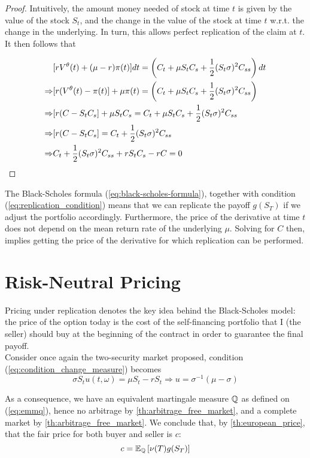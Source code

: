 \documentclass[../TGMAFFIRO.tex]{subfiles}
\begin{document}
\begin{proof}
	Intuitively, the amount money needed of stock at time $t$ is given by the value of the stock $S_t$, and the change in the value of the stock at time $t$ w.r.t. the change in the underlying. In turn, this allows perfect replication of the claim at $t$. It then follows that
	
	\begin{align}
		&[rV^\theta(t) + (\mu - r) \pi(t)] dt = \left(C_t + \mu S_t C_s + \frac{1}{2}(S_t\sigma)^2C_{ss} \right) dt\nonumber\\
		\Rightarrow & [r(V^\theta(t) - \pi(t)] + \mu\pi(t) = \left(C_t + \mu S_t C_s + \frac{1}{2}(S_t\sigma)^2C_{ss} \right) \nonumber\\
		\Rightarrow &[r(C - S_t C_s] + \mu S_t C_s = C_t + \mu S_t C_s + \frac{1}{2}(S_t\sigma)^2C_{ss} \nonumber \\
		\Rightarrow &[r(C - S_t C_s] = C_t + \frac{1}{2}(S_t\sigma)^2C_{ss} \nonumber \\
		\Rightarrow & C_t + \frac{1}{2}(S_t\sigma)^2C_{ss} + rS_t C_s - rC = 0
	\end{align}
 \end{proof}
 
 \begin{remark}
 	The Black-Scholes formula (\ref{eq:black-scholes-formula}), together with condition (\ref{eq:replication_condition}) means that we can replicate the payoff $g(S_T)$ if we adjust the portfolio accordingly. Furthermore, the price of the derivative at time $t$ does not depend on the mean return rate of the underlying $\mu$. Solving for $C$ then, implies getting the price of the derivative for which replication can be performed.
 \end{remark}
 
 \section{Risk-Neutral Pricing}
  Pricing under replication denotes the key idea behind the Black-Scholes model: the price of the option today is the cost of the self-financing portfolio that I (the seller) should buy at the beginning of the contract in order to guarantee the final payoff.\\
 
  Consider once again the two-security market proposed, condition (\ref{eq:condition_change_measure}) becomes
\[
	\sigma S_t u(t,\omega) = \mu S_t - r S_t \Rightarrow u = \sigma^{-1}(\mu - \sigma)
\]


As a consequence, we have an equivalent martingale measure $\mathbb{Q}$ as defined on (\ref{eq:emmq}), hence no arbitrage by \ref{th:arbitrage_free_market}, and a complete market by \ref{th:arbitrage_free_market}. We conclude that, by \ref{th:european_price}, that the fair price for both buyer and seller is $c$:
\begin{equation}\label{eq:risk-neutral-price}
  c = \mathbb{E}_{\mathbb{Q}}\left[\nu(T)g(S_T)\right]
\end{equation}
\end{document}
